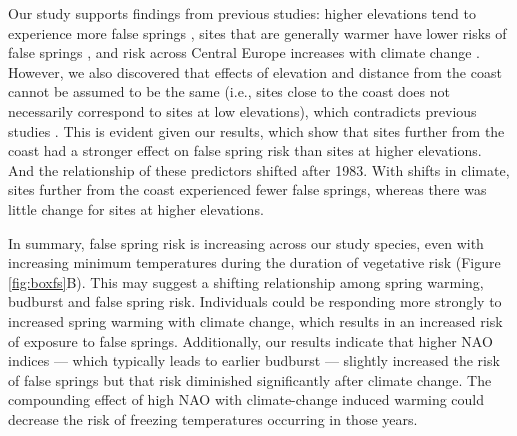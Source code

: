 \documentclass{article}\usepackage[]{graphicx}\usepackage[]{color}
\begin{document}
Our study supports findings from previous studies: higher elevations tend to experience more false springs \citep{Vitasse2018, Vitra2017}, sites that are generally warmer have lower risks of false springs \citep{Wypych2016}, and risk across Central Europe increases with climate change \citep{Liu2018}. However, we also discovered that effects of elevation and distance from the coast cannot be assumed to be the same (i.e., sites close to the coast does not necessarily correspond to sites at low elevations), which contradicts previous studies \citep{Ma2018}. This is evident given our results, which show that sites further from the coast had a stronger effect on false spring risk than sites at higher elevations. And the relationship of these predictors shifted after 1983. With shifts in climate, sites further from the coast experienced fewer false springs, whereas there was little change for sites at higher elevations.
 
In summary, false spring risk is increasing across our study species, even with increasing minimum temperatures during the duration of vegetative risk (Figure \ref{fig:boxfs}B). This may suggest a shifting relationship among spring warming, budburst and false spring risk. Individuals could be responding more strongly to increased spring warming with climate change, which results in an increased risk of exposure to false springs. Additionally, our results indicate that higher NAO indices --- which typically leads to earlier budburst --- slightly increased the risk of false springs but that risk diminished significantly after climate change. The compounding effect of high NAO with climate-change induced warming could decrease the risk of freezing temperatures occurring in those years.%
\end{document}
